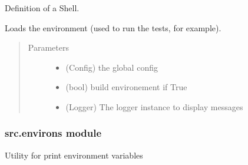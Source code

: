 \documentclass[a4paper,10pt,english]{sphinxmanual}
\begin{document}

\begin{fulllineitems}
\label{\detokenize{apidoc_src/src:src.environment.Shell}}
Definition of a Shell.

\end{fulllineitems}


\begin{fulllineitems}
\label{\detokenize{apidoc_src/src:src.environment.load_environment}}
Loads the environment (used to run the tests, for example).
\begin{quote}\begin{description}
\item[{Parameters}] \leavevmode\begin{itemize}
\item {} 
 \textendash{} (Config) the global config

\item {} 
 \textendash{} (bool) build environement if True

\item {} 
 \textendash{} (Logger) The logger instance to display messages

\end{itemize}

\end{description}\end{quote}

\end{fulllineitems}



\subsubsection{src.environs module}
\label{\detokenize{apidoc_src/src:module-src.environs}}\label{\detokenize{apidoc_src/src:src-environs-module}}
Utility for print environment variables
\end{document}
